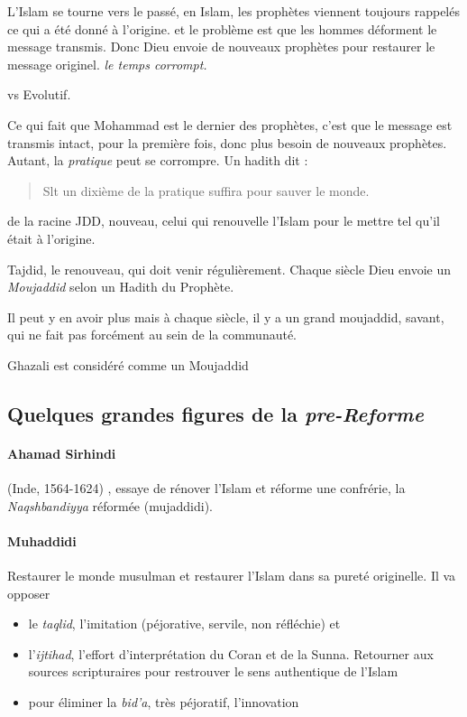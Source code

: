  \begin{Def}
 L'Islam se tourne vers le passé, en Islam, les prophètes viennent toujours rappelés ce qui a été donné à l'origine. et le problème est que les hommes déforment le message transmis. Donc Dieu envoie de nouveaux prophètes pour restaurer le message originel. \textit{le temps corrompt.}
 
 \end{Def}
 vs Evolutif. 
 
 Ce qui fait que Mohammad est le dernier des prophètes, c'est que le message est transmis intact, pour la première fois, donc plus besoin de nouveaux prophètes. Autant, la \textit{pratique} peut se corrompre. 
 Un hadith dit : 
 \begin{quote}
     Slt un dixième de la pratique suffira pour sauver le monde.
 \end{quote}
 
 \begin{Def}[Moujaddid]
 de la racine JDD, nouveau, celui qui renouvelle l'Islam pour le mettre tel qu'il était à l'origine. 
 \end{Def}

 
 \begin{Def}[tajdid]
 Tajdid, le renouveau, qui doit venir régulièrement. Chaque siècle Dieu envoie un \textit{Moujaddid} selon un Hadith du Prophète.
 \end{Def}
 
 
 Il peut y en avoir plus mais à chaque siècle, il y a un grand moujaddid, savant, qui ne fait pas forcément au sein de la communauté. 
  \begin{Ex}
 Ghazali est considéré comme un Moujaddid
 \end{Ex}
 
 \subsection{Quelques grandes figures de la \textit{pre-Reforme}}
 

\paragraph{Ahamad Sirhindi} (Inde, 1564-1624) , essaye de rénover l'Islam et réforme une confrérie, la \emph{Naqshbandiyya} réformée (mujaddidi). 
\paragraph{Muhaddidi} Restaurer le monde musulman et restaurer l'Islam dans sa pureté originelle. Il va opposer 
\begin{itemize}
    \item le \emph{taqlid}, l'imitation (péjorative, servile, non réfléchie) et
    \item l'\emph{ijtihad}, l'effort d'interprétation du Coran et de la Sunna. Retourner aux sources scripturaires pour restrouver le sens authentique de l'Islam
    \item pour éliminer la \emph{bid'a}, très péjoratif, l'innovation
\end{itemize}  

